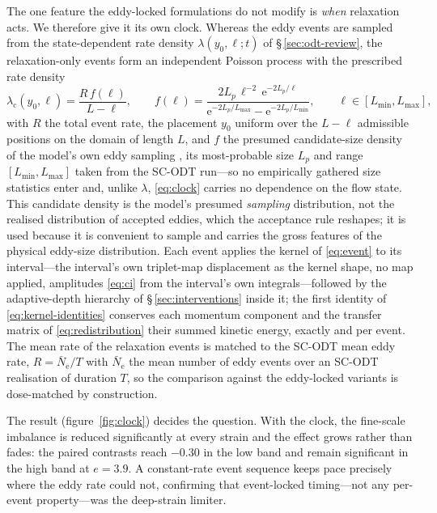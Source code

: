 \documentclass[lineno]{JFM-FLM_Au}
\begin{document}
The one feature the eddy-locked formulations do not modify is \emph{when} relaxation acts. We therefore give it its own clock. Whereas the eddy
events are sampled from the state-dependent rate density
$\lambda(y_0,\ell;t)$ of \S\,\ref{sec:odt-review}, the relaxation-only
events form an independent Poisson process with the prescribed rate
density
\begin{equation}
  \lambda_{\mathrm c}(y_0,\ell)
  = \frac{R\,f(\ell)}{L-\ell},
  \qquad
  f(\ell)
  = \frac{2L_p\,\ell^{-2}\,\mathrm{e}^{-2L_p/\ell}}{\mathrm{e}^{-2L_p/L_{\max}}-\mathrm{e}^{-2L_p/L_{\min}}},
  \qquad \ell\in[L_{\min},L_{\max}],
  \label{eq:clock}
\end{equation}
with $R$ the total event rate, the placement $y_0$ uniform over the
$L-\ell$ admissible positions on the domain of length $L$, and $f$ the
presumed candidate-size density of the model's own eddy sampling
\citep{Kerstein1999,StephensLignell2021}, its most-probable size $L_p$
and range $[L_{\min},L_{\max}]$ taken from the SC-ODT run---so no
empirically gathered size statistics enter and, unlike $\lambda$,
\eqref{eq:clock} carries no dependence on the flow state. This candidate density is the model's presumed \emph{sampling} distribution, not the realised distribution of accepted eddies, which the acceptance rule reshapes; it is used because it is convenient to sample and carries the gross features of the physical eddy-size distribution. Each event applies the kernel of \eqref{eq:event} to its interval---the
interval's own triplet-map displacement as the kernel shape, no map
applied, amplitudes \eqref{eq:ci} from the interval's own
integrals---followed by the adaptive-depth hierarchy of
\S\,\ref{sec:interventions} inside it; the first identity of
\eqref{eq:kernel-identities} conserves each momentum component and
the transfer matrix of \eqref{eq:redistribution} their summed kinetic
energy, exactly and per event. The mean rate of the relaxation events is matched to the SC-ODT mean eddy rate, $R=\bar N_{\mathrm e}/T$ with $\bar N_{\mathrm e}$ the mean number of eddy events over an SC-ODT realisation of duration
$T$, so the comparison against the eddy-locked variants is
dose-matched by construction.

The result (figure~\ref{fig:clock}) decides the question. With the
clock, the fine-scale imbalance is reduced significantly at every
strain and the effect grows rather than fades: the paired contrasts
reach $-0.30$ in the low band and remain significant in the high band
at $e=3.9$. A constant-rate event sequence keeps pace precisely where the
eddy rate could not, confirming that event-locked timing---not any
per-event property---was the deep-strain limiter.
\end{document}
